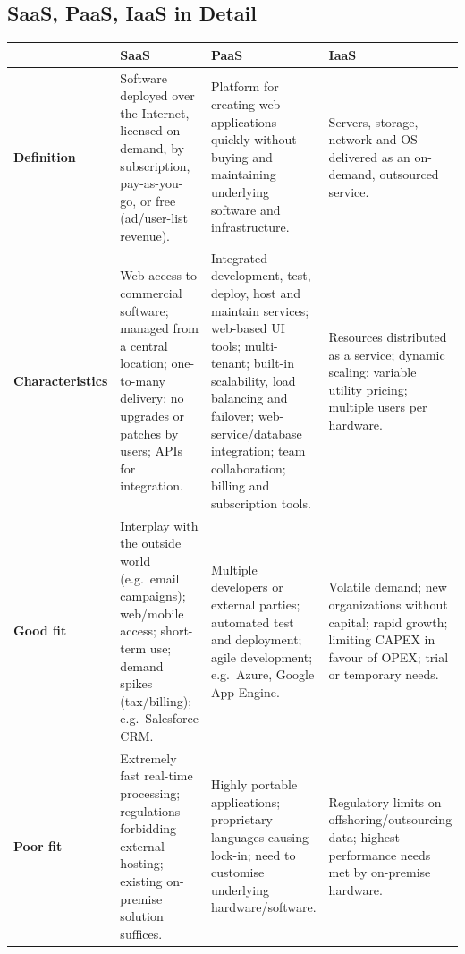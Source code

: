 \subsection{SaaS, PaaS, IaaS in Detail}
\begin{center}
\begin{tabularx}{\textwidth}{>{\bfseries}lXXX}
\toprule
 & SaaS & PaaS & IaaS\\
\midrule
Definition & Software deployed over the Internet, licensed on demand, by subscription, pay-as-you-go, or free
(ad/user-list revenue). & Platform for creating web applications quickly without buying and maintaining
underlying software and infrastructure. & Servers, storage, network and OS delivered as an on-demand,
outsourced service.\\
Characteristics & Web access to commercial software; managed from a central location; one-to-many delivery;
no upgrades or patches by users; APIs for integration. & Integrated development, test, deploy, host and
maintain services; web-based UI tools; multi-tenant; built-in scalability, load balancing and failover;
web-service/database integration; team collaboration; billing and subscription tools. & Resources
distributed as a service; dynamic scaling; variable utility pricing; multiple users per hardware.\\
Good fit & Interplay with the outside world (e.g.\ email campaigns); web/mobile access; short-term use;
demand spikes (tax/billing); e.g.\ Salesforce CRM. & Multiple developers or external parties; automated
test and deployment; agile development; e.g.\ Azure, Google App Engine. & Volatile demand; new
organizations without capital; rapid growth; limiting CAPEX in favour of OPEX; trial or temporary needs.\\
Poor fit & Extremely fast real-time processing; regulations forbidding external hosting; existing on-premise
solution suffices. & Highly portable applications; proprietary languages causing lock-in; need to
customise underlying hardware/software. & Regulatory limits on offshoring/outsourcing data; highest
performance needs met by on-premise hardware.\\
\bottomrule
\end{tabularx}
\end{center}

